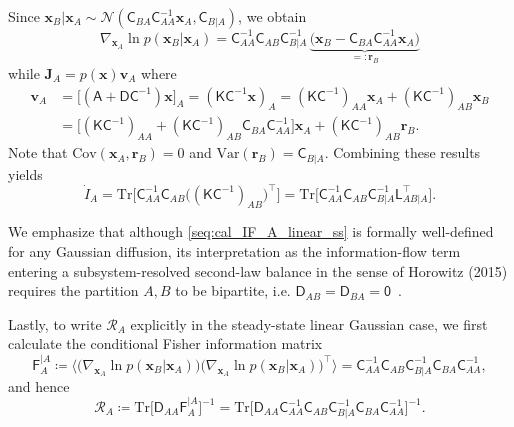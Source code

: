 \documentclass[
 longbibliography,
 twocolumn,
 superscriptaddress,
 amsmath,
 amssymb,
 amsthm,
 amsfonts,
 prl,
 floatfix,
]{revtex4-2}
\newcommand{\matbf}[1]{\boldsymbol{\mathsf{#1}}}
\begin{document}
\begin{widetext}
Since $\bm x_B|\bm x_A\sim\mathcal N(\matbf C_{BA}\matbf C_{AA}^{-1}\bm x_A,\matbf C_{B|A})$, we obtain
\[
    \nabla_{\bm x_A}\!\ln p(\bm x_B|\bm x_A)
    =\matbf C_{AA}^{-1}\matbf C_{AB}\matbf C_{B|A}^{-1}
    \,\underbrace{\!
    \big(\bm x_B-\matbf C_{BA}\matbf C_{AA}^{-1}\bm x_A\big)}_{=:\bm r_B}
\]
while $\bm J_A=p(\bm x)\bm v_A$ where
\begin{equation*}
\begin{aligned}
    \bm v_A&=\big[(\matbf A+\matbf D\matbf C^{-1})\bm x\big]_A
    =(\matbf K\matbf C^{-1}\bm x)_A
    =(\matbf K\matbf C^{-1})_{AA}\bm x_A+(\matbf K\matbf C^{-1})_{AB}\bm x_B
    \\
    &=\big[(\matbf K\matbf C^{-1})_{AA}+(\matbf K\matbf C^{-1})_{AB}\matbf C_{BA}\matbf C_{AA}^{-1}\big]\bm x_A
    +(\matbf K\matbf C^{-1})_{AB}\bm r_B.
\end{aligned}
\end{equation*}
Note that $\mathrm{Cov}(\bm x_A,\bm r_B)=0$ and $\mathrm{Var}(\bm r_B)=\matbf C_{B|A}$.
Combining these results yields
\begin{equation}
    \dot I_A=
    \mathrm{Tr}\big[\matbf C_{AA}^{-1}\matbf C_{AB}\big((\matbf K\matbf C^{-1})_{AB}\big)^\intercal\big]
    =\mathrm{Tr}\big[\matbf C_{AA}^{-1}\matbf C_{AB}\matbf C_{B|A}^{-1}\matbf L_{AB|A}^\intercal\big].
    \label{seq:cal_IF_A_linear_ss}
\end{equation}

We emphasize that although \eqref{seq:cal_IF_A_linear_ss} is formally well-defined for any Gaussian diffusion, its interpretation as the information-flow term entering a subsystem-resolved second-law balance in the sense of Horowitz (2015) requires the partition ${A,B}$ to be bipartite, i.e. $\matbf D_{AB}=\matbf D_{BA}=\matbf 0$~\cite{horowitz2015multipartite}.

Lastly, to write $\mathcal R_A$ explicitly in the steady-state linear Gaussian case, we first calculate the conditional Fisher information matrix
\[
    \matbf F_A^{|A}\coloneq
    \Big\langle\big(\nabla_{\bm x_A}\!\ln p(\bm x_B|\bm x_A)\big)
    \big(\nabla_{\bm x_A}\!\ln p(\bm x_B|\bm x_A)\big)^\intercal\Big\rangle
    =\matbf C_{AA}^{-1}\matbf C_{AB}\matbf C_{B|A}^{-1}\matbf C_{BA}\matbf C_{AA}^{-1},
\]
and hence
\begin{equation}
    \mathcal R_A\coloneq
    \mathrm{Tr}\big[\matbf D_{AA}\matbf F_A^{|A}\big]^{-1}
    =\mathrm{Tr}\big[\matbf D_{AA}\matbf C_{AA}^{-1}\matbf C_{AB}\matbf C_{B|A}^{-1}\matbf C_{BA}\matbf C_{AA}^{-1}\big]^{-1}.
    \label{seq:cal_R_A}
\end{equation}


\end{widetext}
\end{document}
